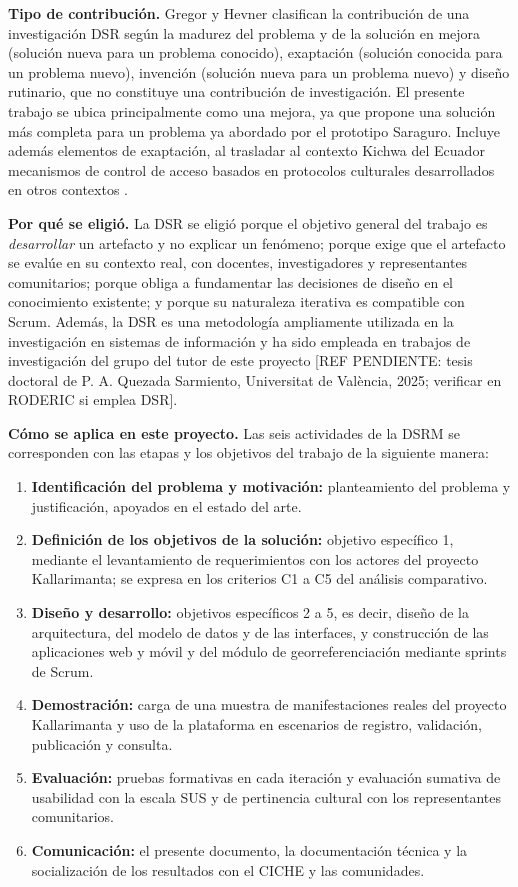 \textbf{Tipo de contribución.} Gregor y Hevner \cite{gregor2013positioning} clasifican la contribución de una investigación DSR según la madurez del problema y de la solución en mejora (solución nueva para un problema conocido), exaptación (solución conocida para un problema nuevo), invención (solución nueva para un problema nuevo) y diseño rutinario, que no constituye una contribución de investigación. El presente trabajo se ubica principalmente como una mejora, ya que propone una solución más completa para un problema ya abordado por el prototipo Saraguro. Incluye además elementos de exaptación, al trasladar al contexto Kichwa del Ecuador mecanismos de control de acceso basados en protocolos culturales desarrollados en otros contextos \cite{christen2017mukurtu}.

\textbf{Por qué se eligió.} La DSR se eligió porque el objetivo general del trabajo es \textit{desarrollar} un artefacto y no explicar un fenómeno; porque exige que el artefacto se evalúe en su contexto real, con docentes, investigadores y representantes comunitarios; porque obliga a fundamentar las decisiones de diseño en el conocimiento existente; y porque su naturaleza iterativa es compatible con Scrum. Además, la DSR es una metodología ampliamente utilizada en la investigación en sistemas de información y ha sido empleada en trabajos de investigación del grupo del tutor de este proyecto [REF PENDIENTE: tesis doctoral de P. A. Quezada Sarmiento, Universitat de València, 2025; verificar en RODERIC si emplea DSR].

\textbf{Cómo se aplica en este proyecto.} Las seis actividades de la DSRM se corresponden con las etapas y los objetivos del trabajo de la siguiente manera:

\begin{enumerate}
  \item \textbf{Identificación del problema y motivación:} planteamiento del problema y justificación, apoyados en el estado del arte.
  \item \textbf{Definición de los objetivos de la solución:} objetivo específico 1, mediante el levantamiento de requerimientos con los actores del proyecto Kallarimanta; se expresa en los criterios C1 a C5 del análisis comparativo.
  \item \textbf{Diseño y desarrollo:} objetivos específicos 2 a 5, es decir, diseño de la arquitectura, del modelo de datos y de las interfaces, y construcción de las aplicaciones web y móvil y del módulo de georreferenciación mediante sprints de Scrum.
  \item \textbf{Demostración:} carga de una muestra de manifestaciones reales del proyecto Kallarimanta y uso de la plataforma en escenarios de registro, validación, publicación y consulta.
  \item \textbf{Evaluación:} pruebas formativas en cada iteración y evaluación sumativa de usabilidad con la escala SUS y de pertinencia cultural con los representantes comunitarios.
  \item \textbf{Comunicación:} el presente documento, la documentación técnica y la socialización de los resultados con el CICHE y las comunidades.
\end{enumerate}

